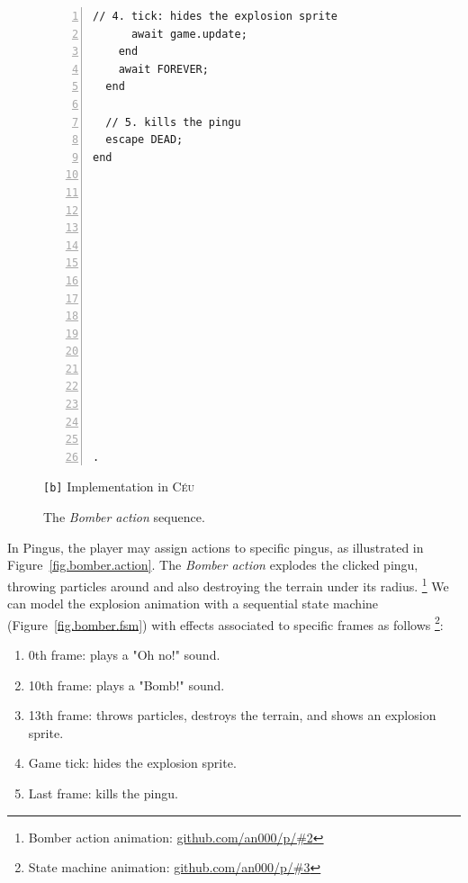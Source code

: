 \documentclass{vgtc}                          %
\newcommand{\CEU}{\textsc{C\'{e}u}\xspace}
\newcommand{\code}[1] {{\small{\texttt{#1}}}}
\newcommand{\bx}{\code{[b]}\xspace}
\begin{document}
\begin{figure}[th!]
\begin{minipage}[t]{0.50\linewidth}
\begin{lstlisting}[numbers=left,xleftmargin=3em]
      // 4. tick: hides the explosion sprite
      await game.update;
    end
    await FOREVER;
  end

  // 5. kills the pingu
  escape DEAD;
end
















.
\end{lstlisting}
\centering\small{\bx Implementation in \CEU}
\end{minipage}
\caption{ The \emph{Bomber action} sequence.
\label{lst.bomber}
}
\end{figure}

In Pingus, the player may assign actions to specific pingus, as illustrated in
Figure~\ref{fig.bomber.action}.
%
The \emph{Bomber action} explodes the clicked pingu, throwing particles around
and also destroying the terrain under its radius.%
\footnote{Bomber action animation: \url{github.com/an000/p/#2} }
%
We can model the explosion animation with a sequential state machine
(Figure~\ref{fig.bomber.fsm}) with effects associated to specific frames as
follows%
\footnote{State machine animation: \url{github.com/an000/p/#3} }:
%
\begin{enumerate}
\item 0th frame:  plays a "Oh no!" sound.
\item 10th frame: plays a "Bomb!" sound.
\item 13th frame: throws particles, destroys the terrain, and shows an
                  explosion sprite.
\item Game tick:  hides the explosion sprite.
\item Last frame: kills the pingu.
\end{enumerate}
\end{document}
